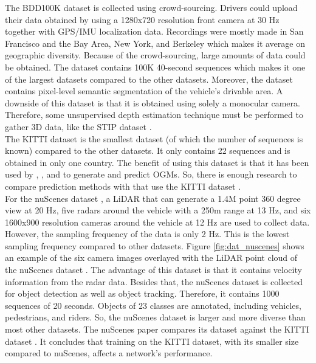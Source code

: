 The \gls{BDD100K} dataset \cite{yu2020bdd100k} is collected using crowd-sourcing. Drivers could upload their data obtained by using a 1280x720 resolution front camera at 30 Hz together with GPS/IMU localization data. Recordings were mostly made in San Francisco and the Bay Area, New York, and Berkeley which makes it average on geographic diversity. Because of the crowd-sourcing, large amounts of data could be obtained. The dataset contains 100K 40-second sequences which makes it one of the largest datasets compared to the other datasets. Moreover, the dataset contains pixel-level semantic segmentation of the vehicle's drivable area. A downside of this dataset is that it is obtained using solely a monocular camera. Therefore, some unsupervised depth estimation technique must be performed to gather 3D data, like the \gls{STIP} dataset \cite{liu2020spatiotemporal}. \\

The \gls{KITTI} dataset \cite{geiger2012we} is the smallest dataset (of which the number of sequences is known) compared to the other datasets. It only contains 22 sequences and is obtained in only one country. The benefit of using this dataset is that it has been used by \cite{itkina2019dynamic}, \cite{mohajerin2019multi}, and \cite{lange2020attention} to generate and predict \glspl{OGM}. So, there is enough research to compare prediction methods with that use the \gls{KITTI} dataset \cite{geiger2012we}. \\

For the nuScenes dataset \cite{caesar2020nuscenes}, a LiDAR that can generate a 1.4M point 360 degree view at 20 Hz, five radars around the vehicle with a 250m range at 13 Hz, and six 1600x900 resolution cameras around the vehicle at 12 Hz are used to collect data. However, the sampling frequency of the data is only 2 Hz. This is the lowest sampling frequency compared to other datasets. Figure \ref{fig:dat_nuscenes} shows an example of the six camera images overlayed with the LiDAR point cloud of the nuScenes dataset \cite{caesar2020nuscenes}. The advantage of this dataset is that it contains velocity information from the radar data. Besides that, the nuScenes dataset is collected for object detection as well as object tracking. Therefore, it contains 1000 sequences of 20 seconds. Objects of 23 classes are annotated, including vehicles, pedestrians, and riders. So, the nuScenes dataset \cite{caesar2020nuscenes} is larger and more diverse than most other datasets. The nuScenes paper \cite{caesar2020nuscenes} compares its dataset against the \gls{KITTI} dataset \cite{geiger2012we}. It concludes that training on the \gls{KITTI} dataset, with its smaller size compared to nuScenes, affects a network's performance. \\

